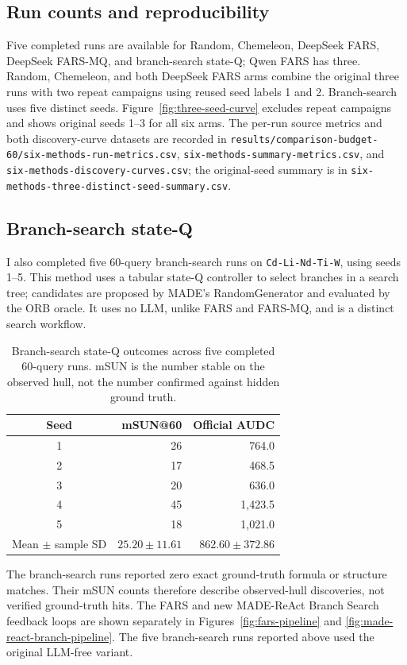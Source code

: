 \documentclass[11pt,a4paper]{article}
\begin{document}
\subsection{Run counts and reproducibility}
Five completed runs are available for Random, Chemeleon, DeepSeek FARS,
DeepSeek FARS-MQ, and branch-search state-Q; Qwen FARS has three. Random,
Chemeleon, and both DeepSeek FARS arms combine the original three runs with
two repeat campaigns using reused seed labels 1 and 2. Branch-search uses
five distinct seeds. Figure~\ref{fig:three-seed-curve} excludes repeat
campaigns and shows original seeds 1--3 for all six arms. The per-run source
metrics and both discovery-curve datasets are recorded in
\texttt{results/comparison-budget-60/six-methods-run-metrics.csv},
\texttt{six-methods-summary-metrics.csv}, and
\texttt{six-methods-discovery-curves.csv}; the original-seed summary is in
\texttt{six-methods-three-distinct-seed-summary.csv}.

\subsection{Branch-search state-Q}
I also completed five 60-query branch-search runs on
\texttt{Cd-Li-Nd-Ti-W}, using seeds 1--5. This method uses a tabular
state-Q controller to select branches in a search tree; candidates are
proposed by MADE's RandomGenerator and evaluated by the ORB oracle. It uses
no LLM, unlike FARS and FARS-MQ, and is a distinct search workflow.

\begin{table}[H]
\centering
\small
\begin{tabular}{@{}crr@{}}
\toprule
Seed & mSUN@60 & Official AUDC\\
\midrule
1 & 26 & 764.0\\
2 & 17 & 468.5\\
3 & 20 & 636.0\\
4 & 45 & 1,423.5\\
5 & 18 & 1,021.0\\
\midrule
Mean \(\pm\) sample SD & \(25.20\pm11.61\) & \(862.60\pm372.86\)\\
\bottomrule
\end{tabular}
\caption{Branch-search state-Q outcomes across five completed 60-query runs.
mSUN is the number stable on the observed hull, not the number confirmed
against hidden ground truth.}
\label{tab:branch-search-results}
\end{table}

The branch-search runs reported zero exact ground-truth formula or structure
matches. Their mSUN counts therefore describe observed-hull discoveries,
not verified ground-truth hits. The FARS and new MADE-ReAct Branch Search
feedback loops are shown separately in Figures~\ref{fig:fars-pipeline} and
\ref{fig:made-react-branch-pipeline}. The five branch-search runs reported
above used the original LLM-free variant.
\end{document}
